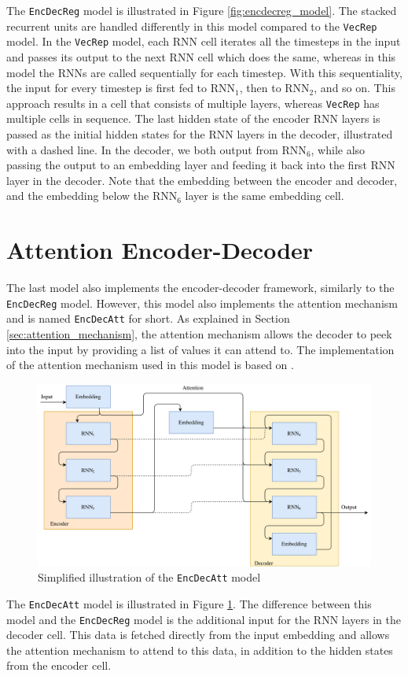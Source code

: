 The {\tt EncDecReg} model is illustrated in Figure \ref{fig:encdecreg_model}. The stacked recurrent units are handled differently in this model compared to the {\tt VecRep} model. In the {\tt VecRep} model, each RNN cell iterates all the timesteps in the input and passes its output to the next RNN cell which does the same, whereas in this model the RNNs are called sequentially for each timestep. With this sequentiality, the input for every timestep is first fed to \(\text{RNN}_1\), then to \(\text{RNN}_2\), and so on. This approach results in a cell that consists of multiple layers, whereas {\tt VecRep} has multiple cells in sequence. The last hidden state of the encoder RNN layers is passed as the initial hidden states for the RNN layers in the decoder, illustrated with a dashed line. In the decoder, we both output from \(\text{RNN}_6\), while also passing the output to an embedding layer and feeding it back into the first RNN layer in the decoder. Note that the embedding between the encoder and decoder, and the embedding below the \(\text{RNN}_6\) layer is the same embedding cell.


\section{Attention Encoder-Decoder}
\label{sec:attention_encoder_decoder}
The last model also implements the encoder-decoder framework, similarly to the {\tt EncDecReg} model. However, this model also implements the attention mechanism and is named {\tt EncDecAtt} for short. As explained in Section \ref{sec:attention_mechanism}, the attention mechanism allows the decoder to peek into the input by providing a list of values it can attend to. The implementation of the attention mechanism used in this model is based on \cite{vinyals2015grammar}.

\begin{figure}[!ht]
    \centering
    \includegraphics[width=1\textwidth]{fig/models/encdecatt_model.png}
    \caption{Simplified illustration of the {\tt EncDecAtt} model}
    \label{fig:encdecattg_model}
\end{figure}

The {\tt EncDecAtt} model is illustrated in Figure \ref{fig:encdecattg_model}. The difference between this model and the {\tt EncDecReg} model is the additional input for the RNN layers in the decoder cell. This data is fetched directly from the input embedding and allows the attention mechanism to attend to this data, in addition to the hidden states from the encoder cell.
